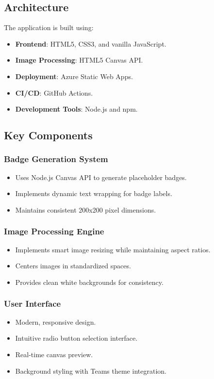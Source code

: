 \documentclass[12pt]{article}
\begin{document}
\subsection{Architecture}
The application is built using:
\begin{itemize}
    \item \textbf{Frontend}: HTML5, CSS3, and vanilla JavaScript.
    \item \textbf{Image Processing}: HTML5 Canvas API.
    \item \textbf{Deployment}: Azure Static Web Apps.
    \item \textbf{CI/CD}: GitHub Actions.
    \item \textbf{Development Tools}: Node.js and npm.
\end{itemize}

\subsection{Key Components}
\subsubsection{Badge Generation System}
\begin{itemize}
    \item Uses Node.js Canvas API to generate placeholder badges.
    \item Implements dynamic text wrapping for badge labels.
    \item Maintains consistent 200x200 pixel dimensions.
\end{itemize}

\subsubsection{Image Processing Engine}
\begin{itemize}
    \item Implements smart image resizing while maintaining aspect ratios.
    \item Centers images in standardized spaces.
    \item Provides clean white backgrounds for consistency.
\end{itemize}

\subsubsection{User Interface}
\begin{itemize}
    \item Modern, responsive design.
    \item Intuitive radio button selection interface.
    \item Real-time canvas preview.
    \item Background styling with Teams theme integration.
\end{itemize}
\end{document}
